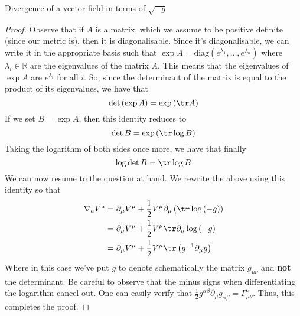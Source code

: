 \begin{thm}{Divergence of a vector field in terms of $\sqrt{ - g }  $}
\begin{proof}
	Observe that if $ A $ is a matrix, which we assume 
	to be positive definite (since our metric is), then 
	it is diagonalisable. Since it's diagonalisable, 
	we can write it in the appropriate basis such that 
	$ \exp A  = \text{diag} \left( e ^{ \lambda _ 1 }, \dots, e ^{ \lambda _ n } \right) $ where $ \lambda _i \in \mathbb{R }$ are the eigenvalues of the matrix $ A $. This means that the eigenvalues of $ \exp A $ are $ e ^{ \lambda _ i } $ for all $ i $. So, since the determinant of the matrix is equal to 
	the product of its eigenvalues, we have that 
	\[
		\det \left( \exp A  \right)   = \exp \left( \tr A  \right)  
	\] If we set $ B = \exp A $, then this identity reduces to 
	\[
		\det B = \exp \left( \tr \log B  \right)  
	\] Taking the logarithm of both sides once more, we 
	have that finally 
	\[
	 \log \det B = \tr \log B 
	\] We can now resume to 
	the question at hand. We rewrite the above using this identity 
	so that 
	\begin{align*}
		\nabla _ a V ^ a &=  \partial  _ \mu V ^ \mu 
		+ \frac{1}{2 } V ^  \mu \partial  _ \mu \left( \tr \log \left(  - g  \right)   \right)  \\ 
		&=  \partial  _ \mu V ^ \mu + \frac{1}{2 } V ^ \mu 
		\tr \partial  _ \mu \log \left(  -g  \right)  \\
		&=  \partial  _ \mu V ^ \mu 
		+ \frac{1}{2 } V ^ \mu \tr \left( g ^{ - 1 } \partial  _ \mu g  \right) 
	\end{align*}
	Where in this case we've put  $ g $ to denote 
	schematically the matrix $ g_{ \mu \nu }  $  and 
	\textbf{not } the determinant. Be careful 
	to observe that the minus signs when 
	differentiating the logarithm cancel out. 
	One can easily verify that $ \frac{1}{2 }g ^{ \alpha \beta } \partial  _ \mu 
	g _{ \alpha \beta }  = \Gamma ^{ \nu } _{ \mu \nu } $. 
	Thus, this completes the proof. 
\end{proof}
\end{thm}

